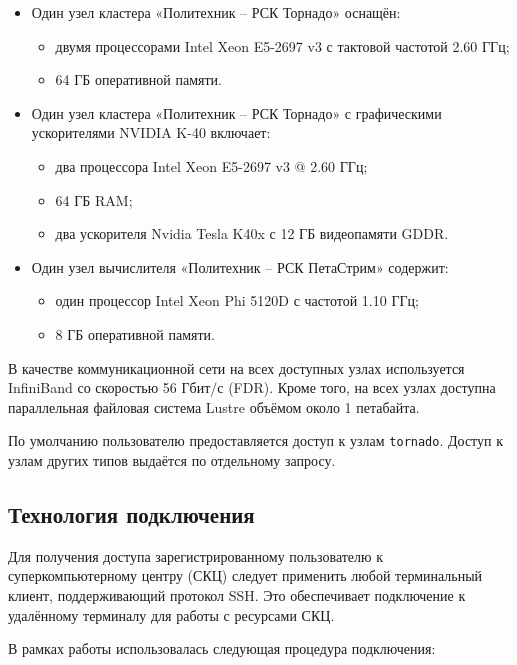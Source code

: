 \documentclass{article}[14pt]
\begin{document}
\begin{itemize}
\item Один узел кластера «Политехник – РСК Торнадо» оснащён:
  \begin{itemize}
    \item двумя процессорами Intel Xeon E5-2697 v3 с тактовой частотой 2.60 ГГц;
    \item 64 ГБ оперативной памяти.
  \end{itemize}

\item Один узел кластера «Политехник – РСК Торнадо» с графическими ускорителями NVIDIA K-40 включает:
  \begin{itemize}
    \item два процессора Intel Xeon E5-2697 v3 @ 2.60 ГГц;
    \item 64 ГБ RAM;
    \item два ускорителя Nvidia Tesla K40x с 12 ГБ видеопамяти GDDR.
  \end{itemize}

\item Один узел вычислителя «Политехник – РСК ПетаСтрим» содержит:
  \begin{itemize}
    \item один процессор Intel Xeon Phi 5120D с частотой 1.10 ГГц;
    \item 8 ГБ оперативной памяти.
  \end{itemize}
\end{itemize}

В качестве коммуникационной сети на всех доступных узлах используется InfiniBand со скоростью 56 Гбит/с (FDR). Кроме того, на всех узлах 
доступна параллельная файловая система Lustre объёмом около 1 петабайта.

По умолчанию пользователю предоставляется доступ к узлам \texttt{tornado}. Доступ к узлам других типов выдаётся по отдельному запросу.

\subsection{Технология подключения}

Для получения доступа зарегистрированному пользователю к суперкомпьютерному центру (СКЦ) следует применить любой терминальный клиент, 
поддерживающий протокол SSH. Это обеспечивает подключение к удалённому терминалу для работы с ресурсами СКЦ.

В рамках работы использовалась следующая процедура подключения:
\end{document}

